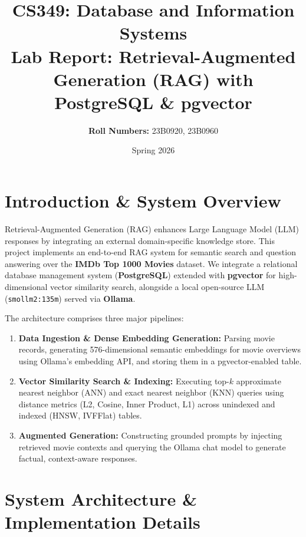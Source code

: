 \documentclass[11pt,a4paper]{article}
\title{\vspace{-1.5em}\Large\textbf{CS349: Database and Information Systems} \\ \large\textbf{Lab Report: Retrieval-Augmented Generation (RAG) with PostgreSQL \& pgvector}\vspace{-0.5em}}
\author{\textbf{Roll Numbers:} 23B0920, 23B0960}
\date{\vspace{-0.5em}Spring 2026\vspace{-1em}}
\begin{document}
\maketitle

\section{Introduction \& System Overview}
Retrieval-Augmented Generation (RAG) enhances Large Language Model (LLM) responses by integrating an external domain-specific knowledge store. This project implements an end-to-end RAG system for semantic search and question answering over the \textbf{IMDb Top 1000 Movies} dataset. We integrate a relational database management system (\textbf{PostgreSQL}) extended with \textbf{pgvector} for high-dimensional vector similarity search, alongside a local open-source LLM (\texttt{smollm2:135m}) served via \textbf{Ollama}.

The architecture comprises three major pipelines:
\begin{enumerate}
    \item \textbf{Data Ingestion \& Dense Embedding Generation:} Parsing movie records, generating 576-dimensional semantic embeddings for movie overviews using Ollama's embedding API, and storing them in a pgvector-enabled table.
    \item \textbf{Vector Similarity Search \& Indexing:} Executing top-$k$ approximate nearest neighbor (ANN) and exact nearest neighbor (KNN) queries using distance metrics (L2, Cosine, Inner Product, L1) across unindexed and indexed (HNSW, IVFFlat) tables.
    \item \textbf{Augmented Generation:} Constructing grounded prompts by injecting retrieved movie contexts and querying the Ollama chat model to generate factual, context-aware responses.
\end{enumerate}

\section{System Architecture \& Implementation Details}
\end{document}
